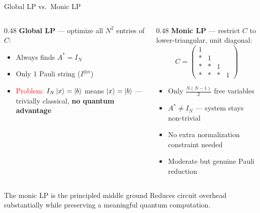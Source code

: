\documentclass{beamer}
\begin{document}
\begin{frame}[shrink=12]{Global LP vs.\ Monic LP}

  \begin{columns}
    \begin{column}{0.48\textwidth}
      \textbf{Global LP} — optimize all $N^2$ entries of $C$:
      \begin{itemize}
        \item Always finds $A^* = I_N$
        \item Only 1 Pauli string ($I^{\otimes n}$)
        \item \textcolor{red}{Problem:} $I_N \ket{x}=\ket{b}$ means $\ket{x}=\ket{b}$
              — trivially classical, \textbf{no quantum advantage}
      \end{itemize}
    \end{column}
    \begin{column}{0.48\textwidth}
      \textbf{Monic LP} — restrict $C$ to lower-triangular, unit diagonal:
      \[
        C = \begin{pmatrix}1&&&\\*&1&&\\*&*&1&\\*&*&*&1\end{pmatrix}
      \]
      \begin{itemize}
        \item Only $\tfrac{N(N-1)}{2}$ free variables
        \item $A^* \neq I_N$ — system stays \textcolor{nublue}{non-trivial}
        \item No extra normalization constraint needed
        \item Moderate but genuine Pauli reduction
      \end{itemize}
    \end{column}
  \end{columns}

  \vspace{6pt}
  \begin{block}{The monic LP is the principled middle ground}
    Reduces circuit overhead substantially while preserving a meaningful quantum computation.
  \end{block}
\end{frame}
\end{document}
